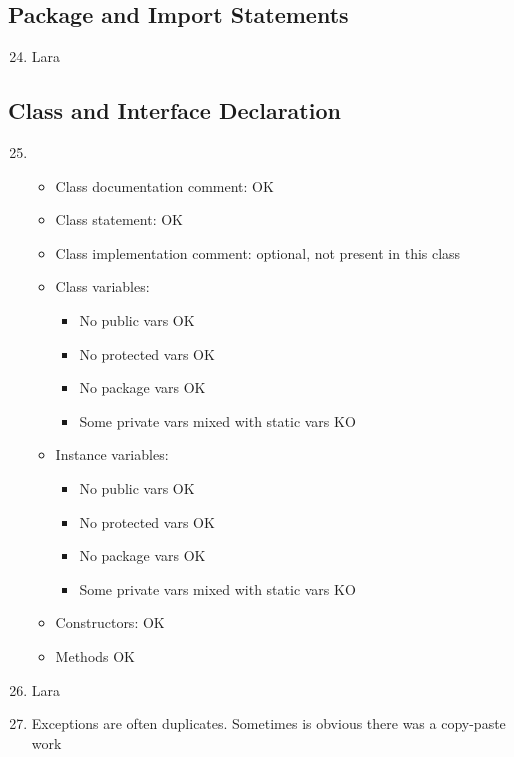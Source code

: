 \subsection{Package and Import Statements}
\begin{enumerate}
	\setcounter{enumi}{23}
	\item Lara
\end{enumerate}
\subsection{Class and Interface Declaration}
\begin{enumerate}
	\setcounter{enumi}{24}
	\item
	\begin{itemize}
		\item Class documentation comment: OK
		\item Class statement: OK
		\item Class implementation comment: optional, not present in this class
		\item Class variables:
		\begin{itemize}
			\item No public vars OK
			
			\item No protected vars OK
			
			\item No package vars OK
			
			\item Some private vars mixed with static vars \color{red}KO \color{black}
		\end{itemize}
		\item Instance variables:
		\begin{itemize}
			\item No public vars OK
			
			\item No protected vars OK
			
			\item No package vars OK
			
			\item Some private vars mixed with static vars \color{red}KO\color{black}
		\end{itemize}
		\item Constructors: OK
		\item Methods OK
	\end{itemize}
	\item Lara
	\item Exceptions are often duplicates. Sometimes is obvious there was a copy-paste work
\end{enumerate}
